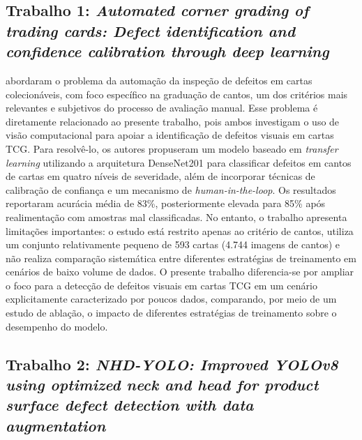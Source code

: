 \documentclass[
    12pt,                %
    openright,           %
    oneside,             %
    a4paper,             %
    english,             %
    brazil               %
]{abntex2}
\begin{document}
\subsection{Trabalho 1: \textit{Automated corner grading of trading cards: Defect identification and confidence calibration through deep learning}}

 abordaram o problema da automação da inspeção de defeitos em cartas colecionáveis, com foco específico na graduação de cantos, um dos critérios mais relevantes e subjetivos do processo de avaliação manual. Esse problema é diretamente relacionado ao presente trabalho, pois ambos investigam o uso de visão computacional para apoiar a identificação de defeitos visuais em cartas TCG. Para resolvê-lo, os autores propuseram um modelo baseado em \textit{transfer learning} utilizando a arquitetura DenseNet201 para classificar defeitos em cantos de cartas em quatro níveis de severidade, além de incorporar técnicas de calibração de confiança e um mecanismo de \textit{human-in-the-loop}. Os resultados reportaram acurácia média de 83\%, posteriormente elevada para 85\% após realimentação com amostras mal classificadas. No entanto, o trabalho apresenta limitações importantes: o estudo está restrito apenas ao critério de cantos, utiliza um conjunto relativamente pequeno de 593 cartas (4.744 imagens de cantos) e não realiza comparação sistemática entre diferentes estratégias de treinamento em cenários de baixo volume de dados. O presente trabalho diferencia-se por ampliar o foco para a detecção de defeitos visuais em cartas TCG em um cenário explicitamente caracterizado por poucos dados, comparando, por meio de um estudo de ablação, o impacto de diferentes estratégias de treinamento sobre o desempenho do modelo. 

\subsection{Trabalho 2: \textit{NHD-YOLO: Improved YOLOv8 using 
optimized neck and head for product surface defect detection with 
data augmentation}}
\end{document}
